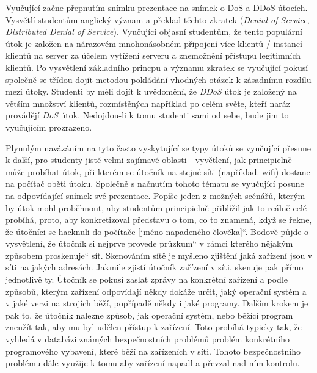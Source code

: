 \documentclass[a4paper, 12pt]{article}
\providecommand{\uv}[1]{\quotedblbase #1\textquotedblleft}
\begin{document}
Vyučující začne přepnutím snímku prezentace na snímek o DoS a DDoS útocích. Vysvětlí studentům anglický význam a překlad těchto zkratek (\textit{Denial of Service}, \textit{Distributed Denial of Service}). Vyučující objasní studentům, že tento populární útok je založen na nárazovém mnohonásobném připojení více klientů / instancí klientů na server za účelem vytížení serveru a znemožnění přístupu legitimních klientů. Po vysvětlení základního princpu a významu zkratek se vyučující pokusí společně se třídou dojít metodou pokládání vhodných otázek k zásadnímu rozdílu mezi útoky. Studenti by měli dojít k uvědomění, že \textit{DDoS} útok je založený na větším množství klientů, rozmístěných například po celém světe, kteří naráz provádějí \textit{DoS} útok. Nedojdou-li k tomu studenti sami od sebe, bude jim to vyučujícím prozrazeno.

Plynulým navázáním na tyto často vyskytující se typy útoků se vyučující přesune k další, pro studenty jistě velmi zajímavé oblasti - vyvětlení, jak principielně může probíhat útok, při kterém se útočník na stejné síti (například. wifi) dostane na počítač oběti útoku. Společně s načnutím tohoto tématu se vyučující posune na odpovídající snímek své prezentace. Popíše jeden z možných scénářů, kterým by útok mohl proběhnout, aby studentům principielně přiblížil jak to reálně celé probíhá, proto, aby konkretizoval představu o tom, co to znamená, když se řekne, že \uv{útočníci se hacknuli do počítače [jméno napadeného člověka]}. Bodově půjde o vysvětlení, že útočník si nejprve provede \uv{průzkum} v rámci kterého nějakým způsobem \uv{proskenuje} síť. Skenováním sítě je myšleno zjištění jaká zařízení jsou v síti na jakých adresách. Jakmile zjistí útočník zařízení v síti, skenuje pak přímo jednotlivě ty. Útočník se pokusí zaslat zprávy na konkrétní zařízení a podle způsobů, kterým zařízení odpovídají někdy dokáže určit, jaký operační systém a v jaké verzi na strojích běží, popřípadě někdy i jaké programy. Dalším krokem je pak to, že útočník nalezne způsob, jak operační systém, nebo běžící program zneužít tak, aby mu byl udělen přístup k zařízení. Toto probíhá typicky tak, že vyhledá v databázi známých bezpečnostních problémů problém konkrétního programového vybavení, které běží na zařízeních v síti. Tohoto bezpečnostního problému dále využije k tomu aby zařízení napadl a převzal nad ním kontrolu.
\end{document}
